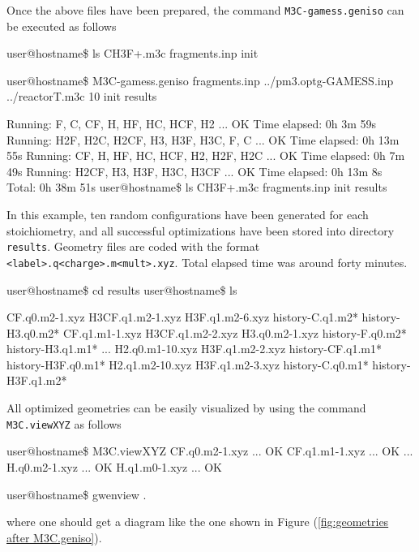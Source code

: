 \documentclass[a4paper,12pt]{article}
\begin{document}
Once the above files have been prepared, the command \texttt{M3C-gamess.geniso} can be executed as follows
\begin{shellexec}
user@hostname\$ ls
CH3F+.m3c  fragments.inp  init

user@hostname\$ M3C-gamess.geniso fragments.inp ../pm3.optg-GAMESS.inp ../reactorT.m3c 10 init results

Running:    F,   C,   CF,   H,   HF,  HC, HCF,  H2 ... OK   Time elapsed: 0h  3m 59s
Running:  H2F, H2C, H2CF,  H3,  H3F, H3C,   F,   C ... OK   Time elapsed: 0h 13m 55s
Running:   CF,   H,   HF,  HC,  HCF,  H2, H2F, H2C ... OK   Time elapsed: 0h  7m 49s
Running: H2CF,  H3,  H3F, H3C, H3CF                ... OK   Time elapsed: 0h 13m  8s
                                                                   Total: 0h 38m 51s
user@hostname\$ ls
CH3F+.m3c  fragments.inp  init  results
\end{shellexec}
In this example, ten random configurations have been generated for each stoichiometry, and all successful optimizations have been stored into directory 
\texttt{results}. Geometry files are coded with the format \texttt{<label>.q<charge>.m<mult>.xyz}.
Total elapsed time was around forty minutes.
\begin{shellexec}
user@hostname\$ cd results
user@hostname\$ ls

CF.q0.m2-1.xyz    H3CF.q1.m2-1.xyz  H3F.q1.m2-6.xyz    history-C.q1.m2*     history-H3.q0.m2*
CF.q1.m1-1.xyz    H3CF.q1.m2-2.xyz  H3.q0.m2-1.xyz     history-F.q0.m2*     history-H3.q1.m1*
...
H2.q0.m1-10.xyz   H3F.q1.m2-2.xyz   history-CF.q1.m1*  history-H3F.q0.m1*
H2.q1.m2-10.xyz   H3F.q1.m2-3.xyz   history-C.q0.m1*   history-H3F.q1.m2*
\end{shellexec}
All optimized geometries can be easily visualized by using the command \texttt{M3C.viewXYZ} as follows
\begin{shellexec}
user@hostname\$ M3C.viewXYZ
CF.q0.m2-1.xyz ... OK
CF.q1.m1-1.xyz ... OK
...
H.q0.m2-1.xyz ... OK
H.q1.m0-1.xyz ... OK

user@hostname\$ gwenview .
\end{shellexec}
where one should get a diagram like the one shown in Figure (\ref{fig:geometries after M3C.geniso}).

\end{document}

